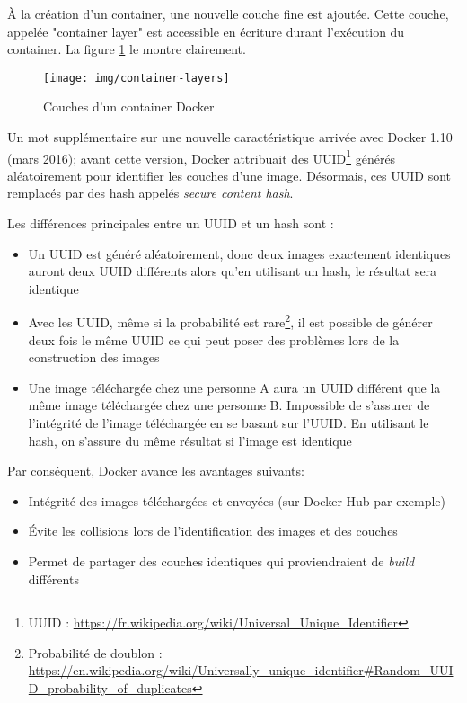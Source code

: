 À la création d'un container, une nouvelle couche fine est ajoutée. Cette couche, appelée "container layer" est accessible en écriture durant l'exécution du container. La figure \ref{docker-container-layers} le montre clairement.

\begin{figure}[hbtp]
\centering
\texttt{[image: img/container-layers]}
\caption{Couches d'un container Docker}
\label{docker-container-layers}
\end{figure}

Un mot supplémentaire sur une nouvelle caractéristique arrivée avec Docker 1.10 (mars 2016); avant cette version, Docker attribuait des UUID\footnote{UUID : \url{https://fr.wikipedia.org/wiki/Universal_Unique_Identifier}} générés aléatoirement pour identifier les couches d'une image. Désormais, ces UUID sont remplacés par des hash appelés \textit{secure content hash}.

Les différences principales entre un UUID et un hash sont :
\begin{itemize}
\item Un UUID est généré aléatoirement, donc deux images exactement identiques auront deux UUID différents alors qu'en utilisant un hash, le résultat sera identique
\item Avec les UUID, même si la probabilité est rare\footnote{Probabilité de doublon : \url{https://en.wikipedia.org/wiki/Universally_unique_identifier\#Random_UUID_probability_of_duplicates}}, il est possible de générer deux fois le même UUID ce qui peut poser des problèmes lors de la construction des images
\item Une image téléchargée chez une personne A aura un UUID différent que la même image téléchargée chez une personne B. Impossible de s'assurer de l'intégrité de l'image téléchargée en se basant sur l'UUID. En utilisant le hash, on s'assure du même résultat si l'image est identique
\end{itemize}

\vspace{2mm}
Par conséquent, Docker avance les avantages suivants:
\begin{itemize}
\item Intégrité des images téléchargées et envoyées (sur Docker Hub par exemple)
\item Évite les collisions lors de l'identification des images et des couches
\item Permet de partager des couches identiques qui proviendraient de \textit{build} différents
\end{itemize}

